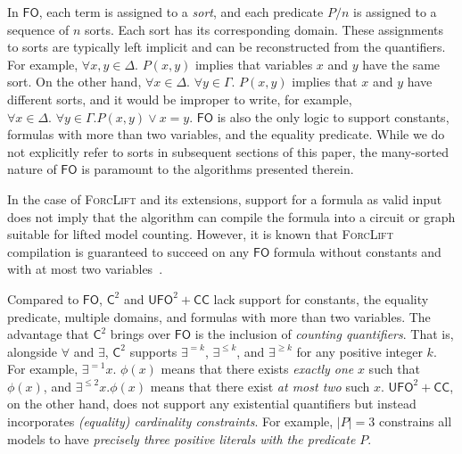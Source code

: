 \documentclass[a4paper,UKenglish,cleveref, autoref, thm-restate]{lipics-v2021}
\newcommand{\Ctwo}{$\mathsf{C}^{2}$}
\newcommand{\FO}{$\mathsf{FO}$}
\newcommand{\UFO}{$\mathsf{UFO}^{2} + \mathsf{CC}$}
\begin{document}
\renewcommand*{\thefootnote}{\arabic{footnote}}

In \FO{}, each term is assigned to a \emph{sort}, and each predicate $P/n$ is
assigned to a sequence of $n$ sorts. Each sort has its corresponding domain.
These assignments to sorts are typically left implicit and can be reconstructed
from the quantifiers. For example, $\forall x,y \in \Delta\text{. }P(x, y)$
implies that variables $x$ and $y$ have the same sort. On the other hand,
$\forall x \in \Delta\text{. }\forall y \in \Gamma\text{. } P(x, y)$ implies
that $x$ and $y$ have different sorts, and it would be improper to write, for
example, $\forall x \in \Delta\text{. }\forall y \in \Gamma\text{.
} P(x, y) \lor x = y$. \FO{} is also the only logic to support constants,
formulas with more than two variables, and the equality predicate. While we do
not explicitly refer to sorts in subsequent sections of this paper, the
many-sorted nature of \FO{} is paramount to the algorithms presented therein.

\begin{remark*}
  In the case of \textsc{ForcLift} and its extensions, support for a formula as
  valid input does not imply that the algorithm can compile the formula into a
  circuit or graph suitable for lifted model counting. However, it is known that
  \textsc{ForcLift} compilation is guaranteed to succeed on any \FO{} formula
  without constants and with at most two
  variables~\cite{DBLP:conf/nips/Broeck11,DBLP:conf/kr/BroeckMD14}.
\end{remark*}

Compared to \FO{}, \Ctwo{} and \UFO{} lack support for constants, the equality
predicate, multiple domains, and formulas with more than two variables. The
advantage that \Ctwo{} brings over \FO{} is the inclusion of \emph{counting
  quantifiers}. That is, alongside $\forall$ and $\exists$, \Ctwo{} supports
$\exists^{=k}$, $\exists^{\le k}$, and $\exists^{\ge k}$ for any positive
integer $k$. For example, $\exists^{=1} x\text{. }\phi(x)$ means that there
exists \emph{exactly one} $x$ such that $\phi(x)$, and $\exists^{\le 2} x\text{.
}\phi(x)$ means that there exist \emph{at most two} such $x$. \UFO{}, on the
other hand, does not support any existential quantifiers but instead
incorporates \emph{(equality) cardinality constraints}. For example, $|P| = 3$
constrains all models to have \emph{precisely three positive literals with the
  predicate $P$}.
\end{document}
